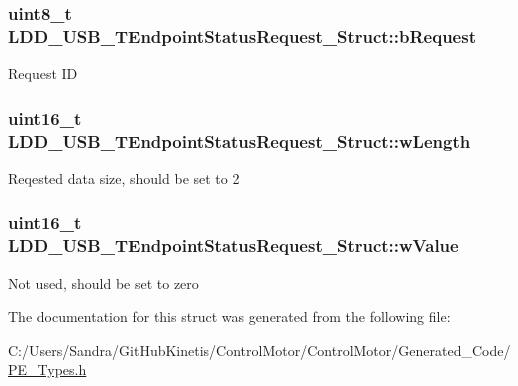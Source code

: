\subsubsection[{\texorpdfstring{b\+Request}{bRequest}}]{\setlength{\rightskip}{0pt plus 5cm}uint8\+\_\+t L\+D\+D\+\_\+\+U\+S\+B\+\_\+\+T\+Endpoint\+Status\+Request\+\_\+\+Struct\+::b\+Request}\hypertarget{struct_l_d_d___u_s_b___t_endpoint_status_request___struct_ae8ab1e11dae5a0b3a4b4a7256a542175}{}\label{struct_l_d_d___u_s_b___t_endpoint_status_request___struct_ae8ab1e11dae5a0b3a4b4a7256a542175}
Request ID 
\subsubsection[{\texorpdfstring{w\+Length}{wLength}}]{\setlength{\rightskip}{0pt plus 5cm}uint16\+\_\+t L\+D\+D\+\_\+\+U\+S\+B\+\_\+\+T\+Endpoint\+Status\+Request\+\_\+\+Struct\+::w\+Length}\hypertarget{struct_l_d_d___u_s_b___t_endpoint_status_request___struct_addba57e934f9c77c9159d7be618dd6dc}{}\label{struct_l_d_d___u_s_b___t_endpoint_status_request___struct_addba57e934f9c77c9159d7be618dd6dc}
Reqested data size, should be set to 2 
\subsubsection[{\texorpdfstring{w\+Value}{wValue}}]{\setlength{\rightskip}{0pt plus 5cm}uint16\+\_\+t L\+D\+D\+\_\+\+U\+S\+B\+\_\+\+T\+Endpoint\+Status\+Request\+\_\+\+Struct\+::w\+Value}\hypertarget{struct_l_d_d___u_s_b___t_endpoint_status_request___struct_a987fe8c9322a22d8b5118eccd4de42c8}{}\label{struct_l_d_d___u_s_b___t_endpoint_status_request___struct_a987fe8c9322a22d8b5118eccd4de42c8}
Not used, should be set to zero 

The documentation for this struct was generated from the following file\+:\begin{DoxyCompactItemize}
\item 
C\+:/\+Users/\+Sandra/\+Git\+Hub\+Kinetis/\+Control\+Motor/\+Control\+Motor/\+Generated\+\_\+\+Code/\hyperlink{_p_e___types_8h}{P\+E\+\_\+\+Types.\+h}\end{DoxyCompactItemize}
